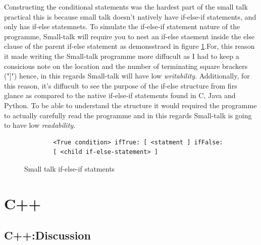 \documentclass[
	12pt, %
]{fphw}
\begin{document}
Constructing the conditional statements was the hardest part of the small talk
practical this is because small talk doesn't natively have if-else-if statements,
and only has if-else statemnets. To simulate the if-else-if statement nature of the
programme, Small-talk will require you to nest an if-else staement inside the else
clause of the parent if-else statement as demonsstraed in figure \ref{ST:IF_ELSE}.For,
this reason it made writing the Small-talk programme more diffucult as I had to
keep a consicious note on the location and the number of terminating square brackers
("]") hence, in this regards Small-talk will have low \emph{writability}. Additionally,
for this reason, it's diffucult to see the purpose of the if-else structure from firs
glance as compared to the native if-else-if statements found in C, Java and Python. To
be able to understand the structure it would required the programme to actually
carefully read the programme and in this regards Small-talk is going to have
low \emph{readability}.

\begin{figure}[!htp]
    \begin{problem}
        \begin{verbatim}
        <True condition> ifTrue: [ <statment ] ifFalse:
        [ <child if-else-statement> ]
        \end{verbatim}
    \end{problem}
    \caption{Small talk if-else-if statments}
    \label{ST:IF_ELSE}
\end{figure}

\section{C++}

\subsection{C++:Discussion}
\end{document}
